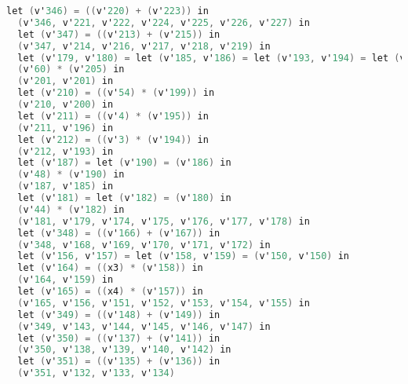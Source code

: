 \documentclass[a4paper, french, 11pt]{article}
\begin{document}
\begin{lstlisting}[style=myStyle, language=C]
  let (v'346) = ((v'220) + (v'223)) in 
  (v'346, v'221, v'222, v'224, v'225, v'226, v'227) in 
  let (v'347) = ((v'213) + (v'215)) in 
  (v'347, v'214, v'216, v'217, v'218, v'219) in 
  let (v'179, v'180) = let (v'185, v'186) = let (v'193, v'194) = let (v'195, v'196) = let (v'199, v'200) = let (v'201) = let (v'205) = (v'173) in 
  (v'60) * (v'205) in 
  (v'201, v'201) in 
  let (v'210) = ((v'54) * (v'199)) in 
  (v'210, v'200) in 
  let (v'211) = ((v'4) * (v'195)) in 
  (v'211, v'196) in 
  let (v'212) = ((v'3) * (v'194)) in 
  (v'212, v'193) in 
  let (v'187) = let (v'190) = (v'186) in 
  (v'48) * (v'190) in 
  (v'187, v'185) in 
  let (v'181) = let (v'182) = (v'180) in 
  (v'44) * (v'182) in 
  (v'181, v'179, v'174, v'175, v'176, v'177, v'178) in 
  let (v'348) = ((v'166) + (v'167)) in 
  (v'348, v'168, v'169, v'170, v'171, v'172) in 
  let (v'156, v'157) = let (v'158, v'159) = (v'150, v'150) in 
  let (v'164) = ((x3) * (v'158)) in 
  (v'164, v'159) in 
  let (v'165) = ((x4) * (v'157)) in 
  (v'165, v'156, v'151, v'152, v'153, v'154, v'155) in 
  let (v'349) = ((v'148) + (v'149)) in 
  (v'349, v'143, v'144, v'145, v'146, v'147) in 
  let (v'350) = ((v'137) + (v'141)) in 
  (v'350, v'138, v'139, v'140, v'142) in 
  let (v'351) = ((v'135) + (v'136)) in 
  (v'351, v'132, v'133, v'134)
\end{lstlisting}
\end{document}
